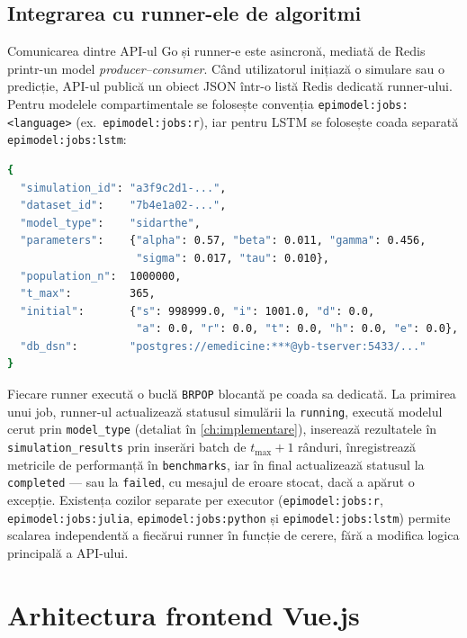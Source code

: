 \subsection{Integrarea cu runner-ele de algoritmi}
\label{subsec:integrare_runnere}

Comunicarea dintre API-ul Go și runner-e este asincronă, mediată de Redis
printr-un model \emph{producer--consumer}. Când utilizatorul inițiază o
simulare sau o predicție, API-ul publică un obiect JSON într-o listă Redis
dedicată runner-ului. Pentru modelele compartimentale se folosește convenția
\texttt{epimodel:jobs:<language>} (ex.\ \texttt{epimodel:jobs:r}), iar pentru
LSTM se folosește coada separată \texttt{epimodel:jobs:lstm}:

\begin{lstlisting}[language=bash, caption={Exemplu mesaj JSON publicat în coada Redis la inițierea unei simulări.}]
{
  "simulation_id": "a3f9c2d1-...",
  "dataset_id":    "7b4e1a02-...",
  "model_type":    "sidarthe",
  "parameters":    {"alpha": 0.57, "beta": 0.011, "gamma": 0.456,
                    "sigma": 0.017, "tau": 0.010},
  "population_n":  1000000,
  "t_max":         365,
  "initial":       {"s": 998999.0, "i": 1001.0, "d": 0.0,
                    "a": 0.0, "r": 0.0, "t": 0.0, "h": 0.0, "e": 0.0},
  "db_dsn":        "postgres://emedicine:***@yb-tserver:5433/..."
}
\end{lstlisting}

Fiecare runner execută o buclă \texttt{BRPOP} blocantă pe coada sa dedicată.
La primirea unui job, runner-ul actualizează statusul simulării la
\texttt{running}, execută modelul cerut prin \texttt{model\_type}
(detaliat în \cref{ch:implementare}), inserează rezultatele în
\texttt{simulation\_results} prin inserări batch de $t_{\max}+1$ rânduri,
înregistrează metricile de performanță în
\texttt{benchmarks}, iar în final actualizează statusul la \texttt{completed}
--- sau la \texttt{failed}, cu mesajul de eroare stocat, dacă a apărut o
excepție. Existența cozilor separate per executor (\texttt{epimodel:jobs:r},
\texttt{epimodel:jobs:julia}, \texttt{epimodel:jobs:python} și
\texttt{epimodel:jobs:lstm}) permite scalarea independentă a fiecărui runner în
funcție de cerere, fără a modifica logica principală a API-ului.

\section{Arhitectura frontend Vue.js}
\label{sec:arhitectura_frontend}

